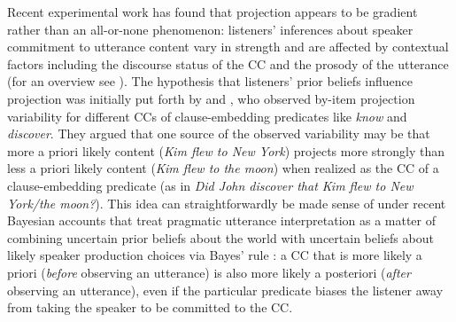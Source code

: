 \documentclass[11pt,fleqn]{article}
\newcommand{\6}{\mbox{$[\hspace*{-.6mm}[$}}
\newcommand{\9}{\mbox{$]\hspace*{-.6mm}]$}}
\begin{document}
%
%
%
%
%
%
%

Recent experimental work has found that projection appears to be gradient rather than an all-or-none phenomenon: listeners' inferences about speaker commitment to utterance content vary in strength and are affected by contextual factors including the discourse status of the CC and the prosody of the utterance (for an overview see ). The hypothesis that listeners' prior beliefs influence projection was initially put forth by  and , who observed by-item projection variability for different CCs of clause-embedding predicates like \emph{know} and \emph{discover}. They argued that one source of the observed variability may be that more a priori likely content ({\em Kim flew to New York}) projects more strongly than less a priori likely content  ({\em Kim flew to the moon}) when realized as the CC of a clause-embedding predicate (as in \emph{Did John discover that Kim flew to New York/the moon?}). This idea can straightforwardly be made sense of under recent Bayesian accounts that treat pragmatic utterance interpretation as a matter of combining uncertain prior beliefs about the world with uncertain beliefs about likely speaker production choices via Bayes' rule \cite{GoodmanFrank2016, degen-etal2015}: a CC that is more likely a priori (\emph{before} observing an utterance) is also more likely a posteriori (\emph{after} observing an utterance), even if the particular predicate biases the listener away from taking the speaker to be committed to the CC.
\end{document}
